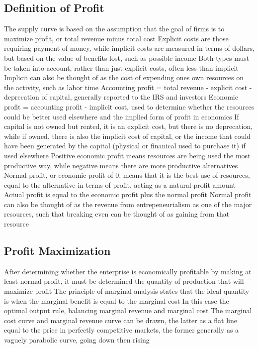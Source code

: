 \documentclass[11 pt, twoside]{article}
\newenvironment{outline*}
{
	\begin{outline}[enumerate]
	}
	{\end{outline}
}
\begin{document}
\subsection{Definition of Profit}
\begin{outline*}
\1 The supply curve is based on the assumption that the goal of firms is to maximize profit, or total revenue minus total cost
\1 Explicit costs are those requiring payment of money, while implicit costs are measured in terms of dollars, but based on the value of benefits lost, such as possible income
\2 Both types must be taken into account, rather than just explicit costs, often less than implicit
\2 Implicit can also be thought of as the cost of expending ones own resources on the activity, such as labor time
\1 Accounting profit = total revenue - explicit cost - deprecation of capital, generally reported to the IRS and investors
\1 Economic profit = accounting profit - implicit cost, used to determine whether the resources could be better used elsewhere and the implied form of profit in economics
\2 If capital is not owned but rented, it is an explicit cost, but there is no deprecation, while if owned, there is also the implicit cost of capital, or the income that could have been generated by the capital (physical or finanical used to purchase it) if used elsewhere
\2 Positive economic profit means resources are being used the most productive way, while negative means there are more productive alternatives
\2 Normal profit, or economic profit of 0, means that it is the best use of resources, equal to the alternative in terms of profit, acting as a natural profit amount
\3 Actual profit is equal to the economic profit plus the normal profit
\3 Normal profit can also be thought of as the revenue from entrepeneurialism as one of the major resources, such that breaking even can be thought of as gaining from that resource
\end{outline*}
\subsection{Profit Maximization}
\begin{outline*}
\1 After determining whether the enterprise is economically profitable by making at least normal profit, it must be determined the quantity of production that will maximize profit
\1 The principle of marginal analysis states that the ideal quantity is when the marginal benefit is equal to the marginal cost
\2 In this case the optimal output rule, balancing marginal revenue and marginal cost
\1 The marginal cost curve and marginal revenue curve can be drawn, the latter as a flat line equal to the price in perfectly competitive markets, the former generally as a vaguely parabolic curve, going down then rising
\end{outline*}
\end{document}
